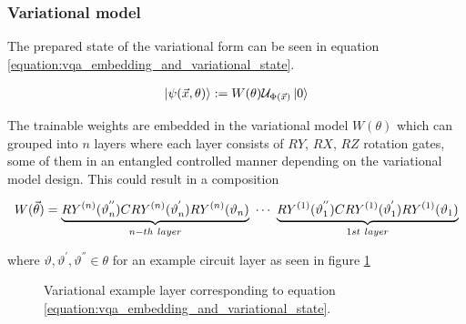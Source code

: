 \subsubsection{Variational model} 
The prepared state of the variational form can be seen in equation \ref{equation:vqa_embedding_and_variational_state}.

\begin{equation} 
    \centering
    \begin{split}
        \ket{\psi(\vec{x},\theta)} := W(\theta)\mathcal{U}_{\Phi(\Vec{x})}\ket{0}
    \end{split}
    \label{equation:vqa_embedding_and_variational_state}
\end{equation}

The trainable weights are embedded in the variational model $W(\theta)$ which can grouped into $n$ layers where each layer consists of $RY$, $RX$, $RZ$ rotation gates, some of them in an entangled controlled manner depending on the variational model design. This could result in a composition 

\begin{equation} 
    \centering
    \begin{split}
        W(\vec{\theta}) = \underbrace{RY^{(n)}(\vartheta_{n}^{''}) CRY^{(n)}(\vartheta_{n}^{'}) RY^{(n)}(\vartheta_{n})}_{n-th\ layer}\ \cdots\ \underbrace{RY^{(1)}(\vartheta_{1}^{''}) CRY^{(1)}(\vartheta_{1}^{'}) RY^{(1)}(\vartheta_{1})}_{1st\ layer}
    \end{split}
    \label{equation:vqa_embedding_and_variational_state}
\end{equation}

where $\vartheta,\vartheta^{'},\vartheta^{''} \in \theta$ for an example circuit layer as seen in figure \ref{fig:variational_example_layer}

\begin{figure}[!h]
    \centering
    \caption{Variational example layer corresponding to equation \ref{equation:vqa_embedding_and_variational_state}.}
    \label{fig:variational_example_layer}
\end{figure}

